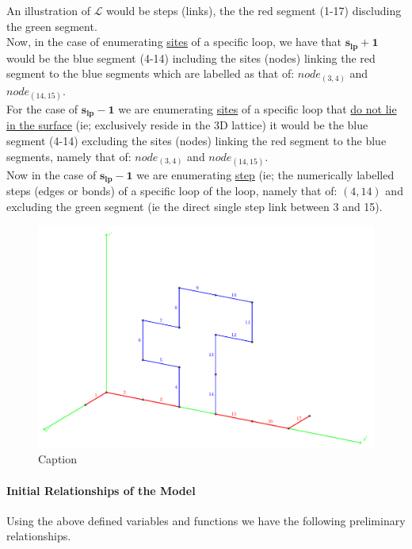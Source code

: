 \documentclass[12pt,letterpaper]{article}
\newcommand{\leng}{\mathcal{L}}
\begin{document}
An illustration of $\boldsymbol{\leng}$ would be steps (links), the the red segment (1-17) discluding the green segment.\\

Now, in the case of enumerating \underline{sites} of a specific loop, we have that
$
\boldsymbol{
    s_{lp}
    +
    1
}
$
would be the blue segment (4-14) including the sites (nodes) linking the red segment to the blue segments which are labelled as that of: $node_{(3,4)}$ and $node_{(14,15)}$.\\

For the case of
$
\boldsymbol{
    s_{lp}
    -
    1
}
$
we are enumerating \underline{sites} of a specific loop that \underline{do not lie in the surface} (ie; exclusively reside in the 3D lattice) it would be the blue segment (4-14) excluding the sites (nodes) linking the red segment to the blue segments, namely that of: $node_{(3,4)}$ and $node_{(14,15)}$.\\

Now in the case of $
\boldsymbol{
    s_{lp}
    -
    1
}
$
we are enumerating \underline{step} (ie; the numerically labelled steps (edges or bonds) of a specific loop of the loop, namely that of: $(4,14)$ and excluding the green segment (ie the direct single step link between 3 and 15).

\begin{figure}[H]
    \centering
    \includegraphics[scale=0.50]{stickball1.pdf}
    \caption{Caption}
    \label{fig:loopSchem}
\end{figure}


\paragraph{Initial Relationships of the Model} Using the above defined variables and functions we have the following preliminary relationships.
\end{document}
